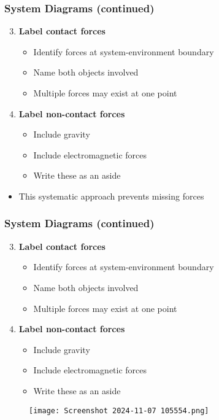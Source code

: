 \documentclass{beamer}
\begin{document}
\begin{frame}
\frametitle{System Diagrams (continued)}
\begin{enumerate}\setcounter{enumi}{2}
    \item \textbf{Label contact forces}
    \pause
    \begin{itemize}
        \item Identify forces at system-environment boundary
        \item Name both objects involved
        \item Multiple forces may exist at one point
    \end{itemize}
    \pause
    \item \textbf{Label non-contact forces}
    \pause
    \begin{itemize}
        \item Include gravity
        \item Include electromagnetic forces
        \item Write these as an aside
    \end{itemize}
\end{enumerate}
\pause
\begin{itemize}
    \item This systematic approach prevents missing forces
\end{itemize}
\end{frame}

\begin{frame}
\frametitle{System Diagrams (continued)}
\begin{enumerate}\setcounter{enumi}{2}
    \item \textbf{Label contact forces}
    \pause
    \begin{itemize}
        \item Identify forces at system-environment boundary
        \item Name both objects involved
        \item Multiple forces may exist at one point
    \end{itemize}
    \pause
    \item \textbf{Label non-contact forces}
    \pause
    \begin{itemize}
        \item Include gravity
        \item Include electromagnetic forces
        \item Write these as an aside
    \end{itemize}
\end{enumerate}
\pause
\begin{figure}[H]
    \centering
    \texttt{[image: Screenshot 2024-11-07 105554.png]}
\end{figure}
\end{frame}
\end{document}

